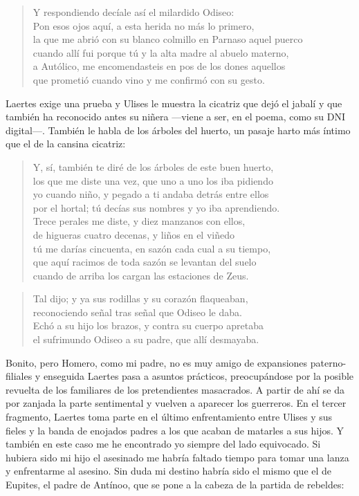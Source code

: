 \begin{verse}
Y respondiendo decíale así el milardido Odiseo:\\
Pon esos ojos aquí, a esta herida no más lo primero,\\
la que me abrió con su blanco colmillo en Parnaso aquel puerco\\
cuando allí fui porque tú y la alta madre al abuelo materno,\\
a Autólico, me encomendasteis en pos de los dones aquellos\\
que prometió cuando vino y me confirmó con su gesto.
\end{verse}

Laertes exige una prueba y Ulises le muestra la cicatriz que dejó el jabalí y que también ha reconocido antes su niñera ---viene a ser, en el poema, como su DNI digital---. También le habla de los árboles del huerto, un pasaje harto más íntimo que el de la cansina cicatriz:

\begin{verse}
Y, sí, también te diré de los árboles de este buen huerto,\\
los que me diste una vez, que uno a uno los iba pidiendo\\
yo cuando niño, y pegado a ti andaba detrás entre ellos\\
por el hortal; tú decías sus nombres y yo iba aprendiendo.\\
Trece perales me diste, y diez manzanos con ellos,\\
de higueras cuatro decenas, y liños en el viñedo\\
tú me darías cincuenta, en sazón cada cual a su tiempo,\\
que aquí racimos de toda sazón se levantan del suelo\\
cuando de arriba los cargan las estaciones de Zeus.
\end{verse}

\begin{verse}
Tal dijo; y ya sus rodillas y su corazón flaqueaban,\\
reconociendo señal tras señal que Odiseo le daba.\\
Echó a su hijo los brazos, y contra su cuerpo apretaba\\
el sufrimundo Odiseo a su padre, que allí desmayaba.
\end{verse}

Bonito, pero Homero, como mi padre, no es muy amigo de expansiones paterno-filiales y enseguida Laertes pasa a asuntos prácticos, preocupándose por la posible revuelta de los familiares de los pretendientes masacrados. A partir de ahí se da por zanjada la parte sentimental y vuelven a aparecer los guerreros. En el tercer fragmento, Laertes toma parte en el último enfrentamiento entre Ulises y sus fieles y la banda de enojados padres a los que acaban de matarles a sus hijos. Y también en este caso me he encontrado yo siempre del lado equivocado. Si hubiera sido mi hijo el asesinado me habría faltado tiempo para tomar una lanza y enfrentarme al asesino. Sin duda mi destino habría sido el mismo que el de Eupites, el padre de Antínoo, que se pone a la cabeza de la partida de rebeldes:

